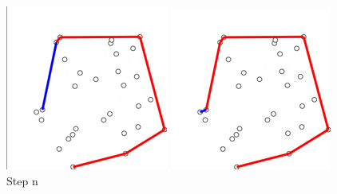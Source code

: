\documentclass[9pt,onecolumn,oneside]{osajnl}
\begin{document}
\begin{figure}[h]
  \centering
  \begin{minipage}[b]{0.18\textwidth}
  	\centering
    \includegraphics[width=\textwidth]{2.png}
    \caption{Step n}
  \end{minipage}
  \hfill
  \begin{minipage}[b]{0.18\textwidth}
  	\centering
    \includegraphics[width=\textwidth]{1.png}

\end{minipage}
\end{figure}
\end{document}
